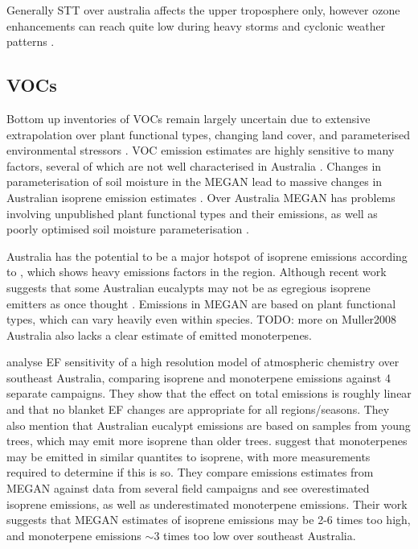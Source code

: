     Generally STT over australia affects the upper troposphere only, however ozone enhancements can reach quite low during heavy storms and cyclonic weather patterns \citep{Alexander2013}.
  
  \subsection{VOCs}
    Bottom up inventories of VOCs remain largely uncertain due to extensive extrapolation over plant functional types, changing land cover, and parameterised environmental stressors \citep{Guenther2000,Kanakidou2005,Millet2006}.
    VOC emission estimates are highly sensitive to many factors, several of which are not well characterised in Australia \citep{Sindelarova2014, Bauwens2016}.
    Changes in parameterisation of soil moisture in the MEGAN lead to massive changes in Australian isoprene emission estimates \citep{Sindelarova2014}.
    Over Australia MEGAN has problems involving unpublished plant functional types and their emissions, as well as poorly optimised soil moisture parameterisation \citep{Emmerson2016}.
    
    Australia has the potential to be a major hotspot of isoprene emissions according to \cite{Guenther2006,Guenther2012}, which shows heavy emissions factors in the region.
    Although recent work suggests that some Australian eucalypts may not be as egregious isoprene emitters as once thought \cite{Emmerson2016}.
    Emissions in MEGAN are based on plant functional types, which can vary heavily even within species.
    TODO: more on Muller2008
    Australia also lacks a clear estimate of emitted monoterpenes.
    
    \cite{Emmerson2016} analyse EF sensitivity of a high resolution model of atmospheric chemistry over southeast Australia, comparing isoprene and monoterpene emissions against 4 separate campaigns.
    They show that the effect on total emissions is roughly linear and that no blanket EF changes are appropriate for all regions/seasons.
    They also mention that Australian eucalypt emissions are based on samples from young trees, which may emit more isoprene than older trees.
    \cite{Emmerson2016} suggest that monoterpenes may be emitted in similar quantites to isoprene, with more measurements required to determine if this is so.
    They compare emissions estimates from MEGAN against data from several field campaigns and see overestimated isoprene emissions, as well as underestimated monoterpene emissions.
    Their work suggests that MEGAN estimates of isoprene emissions may be 2-6 times too high, and monoterpene emissions $\sim3$ times too low over southeast Australia.
    
